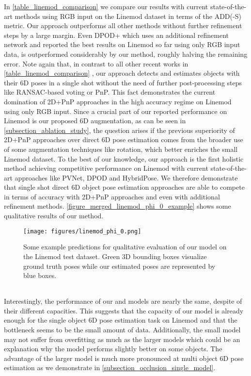 \documentclass[twocolumn, 10pt, letterpaper]{article}
\begin{document}
In \autoref{table_linemod_comparison} we compare our results with current state-of-the-art methods using RGB input on the Linemod dataset in terms of the ADD(-S) metric. Our approach outperforms all other methods without further refinement steps by a large margin. Even DPOD+ which uses an additional refinement network and reported the best results on Linemod so far using only RGB input data, is outperformed considerably by our method, roughly halving the remaining error. Note again that, in contrast to all other recent works in \autoref{table_linemod_comparison} \cite{YOLO6D}\cite{Pix2Pose}\cite{PVNet}\cite{DPOD}\cite{CDPN}\cite{HybridPose}, our approach detects and estimates objects with their 6D poses in a single shot without the need of further post-processing steps like RANSAC-based voting or PnP. This fact demonstrates the current domination of 2D+PnP approaches in the high accuracy regime on Linemod using only RGB input. Since a crucial part of our reported performance on Linemod is our proposed 6D augmentation, as can be seen in \autoref{subsection_ablation_study}, the question arises if the previous superiority of 2D+PnP approaches over direct 6D pose estimation comes from the broader use of some augmentation techniques like rotation, which better enriches the small Linemod dataset. To the best of our knowledge, our approach is the first holistic method achieving competitive performance on Linemod with current state-of-the-art approaches like PVNet\cite{PVNet}, DPOD\cite{DPOD} and HybridPose\cite{HybridPose}. We therefore demonstrate that single shot direct 6D object pose estimation approaches are able to compete in terms of accuracy with 2D+PnP approaches and even with additional refinement methods. \autoref{figure_merged_linemod_phi_0_example} shows some qualitative results of our method.
\begin{figure}[h]
\texttt{[image: figures/linemod\_phi\_0.png]}
\caption{Some example predictions for qualitative evaluation of our  model on the Linemod test dataset. Green 3D bounding boxes visualize ground truth poses while our estimated poses are represented by blue boxes.}
\label{figure_merged_linemod_phi_0_example}
\end{figure}\\
Interestingly, the performance of our  and  models are nearly the same, despite of their different capacities. This suggests that the capacity of our  model is already enough for the single object 6D pose estimation task on Linemod and that the bottleneck seems to be the small amount of data. Additionally, the small  model may not suffer from overfitting as much as the larger models which could be an explanation why the  model performs slightly better on some objects. The advantage of the larger  model is much more pronounced at multi object 6D pose estimation as we demonstrate in \autoref{subsection_occlusion_single_model}.
\end{document}
